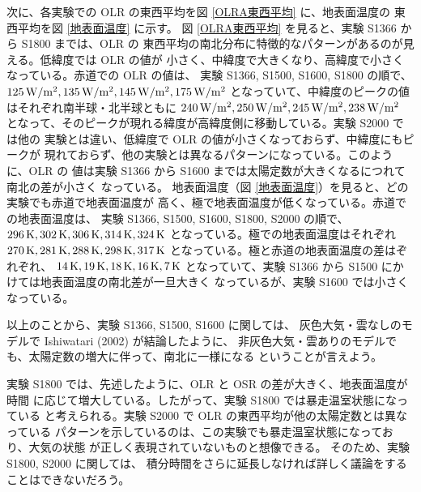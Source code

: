 \documentclass[body]{subfiles}
\begin{document}
次に、各実験での OLR の東西平均を図 \ref{OLRA東西平均} に、地表面温度の
東西平均を図 \ref{地表面温度} に示す。
図 \ref{OLRA東西平均} を見ると、実験 S1366 から S1800 までは、OLR の
東西平均の南北分布に特徴的なパターンがあるのが見える。低緯度では OLR の値が
小さく、中緯度で大きくなり、高緯度で小さくなっている。赤道での OLR の値は、
実験 S1366, S1500, S1600, S1800 の順で、
\(125\hmu{W/m^2},135\hmu{W/m^2},145\hmu{W/m^2},175\hmu{W/m^2}\)
となっていて、中緯度のピークの値はそれぞれ南半球・北半球ともに
\(240\hmu{W/m^2},250\hmu{W/m^2},245\hmu{W/m^2},238\hmu{W/m^2}\)
となって、そのピークが現れる緯度が高緯度側に移動している。実験 S2000 では他の
実験とは違い、低緯度で OLR の値が小さくなっておらず、中緯度にもピークが
現れておらず、他の実験とは異なるパターンになっている。このように、OLR の
値は実験 S1366 から S1600 までは太陽定数が大きくなるにつれて南北の差が小さく
なっている。
地表面温度（図 \ref{地表面温度}）を見ると、どの実験でも赤道で地表面温度が
高く、極で地表面温度が低くなっている。赤道での地表面温度は、
実験 S1366, S1500, S1600, S1800, S2000 の順で、
\(296\hmu{K},302\hmu{K},306\hmu{K},314\hmu{K},324\hmu{K}\)
となっている。極での地表面温度はそれぞれ
\(270\hmu{K},281\hmu{K},288\hmu{K},298\hmu{K},317\hmu{K}\)
となっている。極と赤道の地表面温度の差はぞれぞれ、
\(14\hmu{K},19\hmu{K},18\hmu{K},16\hmu{K},7\hmu{K}\)
となっていて、実験 S1366 から S1500 にかけては地表面温度の南北差が一旦大きく
なっているが、実験 S1600 では小さくなっている。

以上のことから、実験 S1366, S1500, S1600 に関しては、
灰色大気・雲なしのモデルで Ishiwatari \etal (2002) が結論したように、
非灰色大気・雲ありのモデルでも、太陽定数の増大に伴って、南北に一様になる
ということが言えよう。

実験 S1800 では、先述したように、OLR と OSR の差が大きく、地表面温度が時間
に応じて増大している。したがって、実験 S1800 では暴走温室状態になっている
と考えられる。実験 S2000 で OLR の東西平均が他の太陽定数とは異なっている
パターンを示しているのは、この実験でも暴走温室状態になっており、大気の状態
が正しく表現されていないものと想像できる。
そのため、実験 S1800, S2000 に関しては、
積分時間をさらに延長しなければ詳しく議論をすることはできないだろう。
\end{document}
